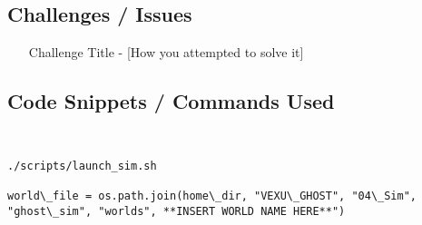 
\subsection*{Challenges / Issues}
\begin{itemize}
    \item [Challenge Title] - [How you attempted to solve it]
\end{itemize}

\subsection*{Code Snippets / Commands Used}
\begin{lstlisting}
    
\end{lstlisting}
\begin{lstlisting}
./scripts/launch_sim.sh
    
world\_file = os.path.join(home\_dir, "VEXU\_GHOST", "04\_Sim", "ghost\_sim", "worlds", **INSERT WORLD NAME HERE**")
\end{lstlisting}


